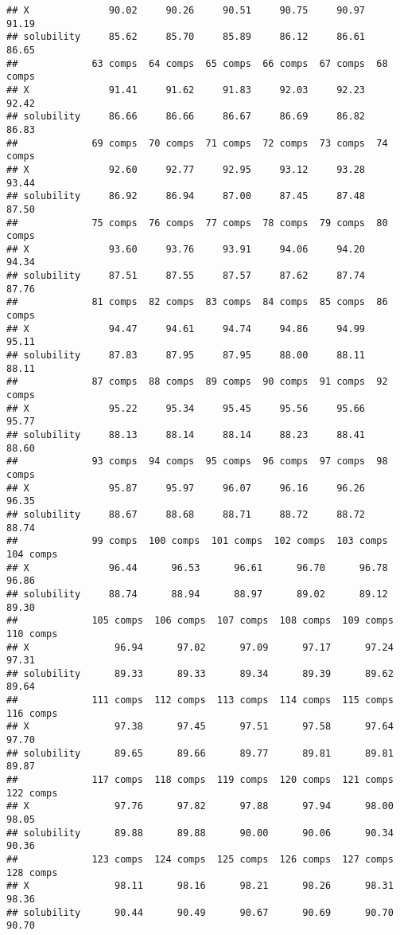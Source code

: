 \documentclass[
]{article}
\begin{document}
\begin{verbatim}
## X              90.02     90.26     90.51     90.75     90.97     91.19
## solubility     85.62     85.70     85.89     86.12     86.61     86.65
##             63 comps  64 comps  65 comps  66 comps  67 comps  68 comps
## X              91.41     91.62     91.83     92.03     92.23     92.42
## solubility     86.66     86.66     86.67     86.69     86.82     86.83
##             69 comps  70 comps  71 comps  72 comps  73 comps  74 comps
## X              92.60     92.77     92.95     93.12     93.28     93.44
## solubility     86.92     86.94     87.00     87.45     87.48     87.50
##             75 comps  76 comps  77 comps  78 comps  79 comps  80 comps
## X              93.60     93.76     93.91     94.06     94.20     94.34
## solubility     87.51     87.55     87.57     87.62     87.74     87.76
##             81 comps  82 comps  83 comps  84 comps  85 comps  86 comps
## X              94.47     94.61     94.74     94.86     94.99     95.11
## solubility     87.83     87.95     87.95     88.00     88.11     88.11
##             87 comps  88 comps  89 comps  90 comps  91 comps  92 comps
## X              95.22     95.34     95.45     95.56     95.66     95.77
## solubility     88.13     88.14     88.14     88.23     88.41     88.60
##             93 comps  94 comps  95 comps  96 comps  97 comps  98 comps
## X              95.87     95.97     96.07     96.16     96.26     96.35
## solubility     88.67     88.68     88.71     88.72     88.72     88.74
##             99 comps  100 comps  101 comps  102 comps  103 comps  104 comps
## X              96.44      96.53      96.61      96.70      96.78      96.86
## solubility     88.74      88.94      88.97      89.02      89.12      89.30
##             105 comps  106 comps  107 comps  108 comps  109 comps  110 comps
## X               96.94      97.02      97.09      97.17      97.24      97.31
## solubility      89.33      89.33      89.34      89.39      89.62      89.64
##             111 comps  112 comps  113 comps  114 comps  115 comps  116 comps
## X               97.38      97.45      97.51      97.58      97.64      97.70
## solubility      89.65      89.66      89.77      89.81      89.81      89.87
##             117 comps  118 comps  119 comps  120 comps  121 comps  122 comps
## X               97.76      97.82      97.88      97.94      98.00      98.05
## solubility      89.88      89.88      90.00      90.06      90.34      90.36
##             123 comps  124 comps  125 comps  126 comps  127 comps  128 comps
## X               98.11      98.16      98.21      98.26      98.31      98.36
## solubility      90.44      90.49      90.67      90.69      90.70      90.70

\end{verbatim}
\end{document}
